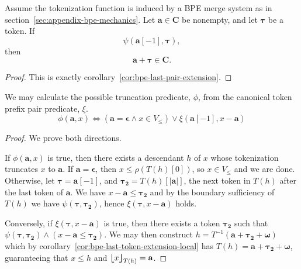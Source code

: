 \begin{corollary}
    \label{cor:bpe-last-token-extension-local}
    Assume the tokenization function is induced by a BPE merge system as in
    section~\ref{sec:appendix-bpe-mechanics}. Let $\mathbf{a} \in \mathbf{C}$ be nonempty,
    and let $\boldsymbol{\tau}$ be a token. If
    \[
    \psi(\mathbf{a}[-1], \boldsymbol{\tau}),
    \]
    then
    \[
    \mathbf{a}+\boldsymbol{\tau} \in \mathbf{C}.
    \]
\end{corollary}
\begin{proof}
    This is exactly corollary~\ref{cor:bpe-last-pair-extension}.
\end{proof}
\begin{theorem}
    We may calculate the possible truncation predicate, $\phi$, from the canonical token prefix pair predicate, $\xi$.
    $$
    \phi(\mathbf{a}, x)
    \iff
    \left( \mathbf{a} = \mathbf{\epsilon} \land x \in V_{\leq} \right)
    \lor
    \xi(\mathbf{a}[-1], x - \mathbf{a})
    $$
\end{theorem}
\begin{proof}
    We prove both directions.
    
    If $\phi(\mathbf{a}, x)$ is true, then there exists a descendant $h$ of $x$
    whose tokenization truncates $x$ to $\mathbf{a}$.
    If $\mathbf{a} = \mathbf{\epsilon}$, then $x \leq \rho(T(h)[0])$, so $x \in V_{\leq}$ and we are done.
    Otherwise, let $\boldsymbol{\tau} = \mathbf{a}[-1]$, and
    $\boldsymbol{\tau_2} = T(h)[|\mathbf{a}|]$, the next token in $T(h)$ after the last token of $\mathbf{a}$.
    We have $x - \mathbf{a} \leq \boldsymbol{\tau_2}$ and by the boundary sufficiency of $T(h)$ we have $\psi(\boldsymbol{\tau}, \boldsymbol{\tau_2})$,
    hence $\xi(\boldsymbol{\tau}, x - \mathbf{a})$ holds.

    Conversely, if $\xi(\boldsymbol{\tau}, x - \mathbf{a})$ is true, then there exists a token $\boldsymbol{\tau_2}$ such that $\psi(\boldsymbol{\tau}, \boldsymbol{\tau_2}) \land (x - \mathbf{a} \leq \boldsymbol{\tau_2})$.
    We may then construct $h = T^{-1}(\mathbf{a} + \boldsymbol{\tau_2} + \boldsymbol{\omega})$
    which by corollary~\ref{cor:bpe-last-token-extension-local} has $T(h) = \mathbf{a} + \boldsymbol{\tau_2} + \boldsymbol{\omega}$,
    guaranteeing that $x \leq h$ and ${\bm{\lfloor}} x {\bm{\rfloor}}_{T(h)} = \mathbf{a}$.

\end{proof}

